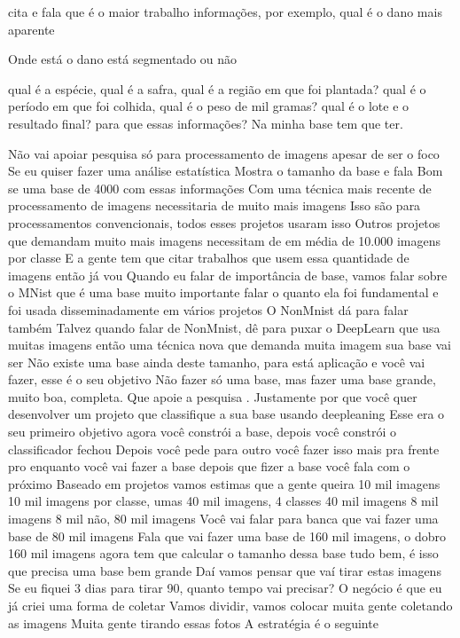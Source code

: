cita e fala que é o maior trabalho
informações, por exemplo, qual é o dano mais aparente

Onde está o dano
está segmentado ou não

qual é a espécie, qual é a safra, qual é a região em que foi plantada?
qual é o período em que foi colhida, qual é o peso de mil gramas?
qual é o lote e o resultado final?
para que essas informações? Na minha base tem que ter.

Não vai apoiar pesquisa só para processamento de imagens
apesar de ser o foco
Se eu quiser fazer uma análise estatística
Mostra o tamanho da base e fala
Bom se uma base de 4000 com essas informações
Com uma técnica mais recente de processamento de imagens
necessitaria de muito mais imagens
Isso são para processamentos convencionais, todos esses projetos usaram isso
Outros projetos que demandam muito mais imagens
necessitam de em média de 10.000 imagens por classe
E a gente tem que citar trabalhos que usem essa quantidade de imagens
então já vou
Quando eu falar de importância de base, vamos falar sobre o MNist
que é uma base muito importante
falar o quanto ela foi fundamental e foi usada disseminadamente em vários projetos
O NonMnist dá para falar também
Talvez quando falar de NonMnist, dê para puxar o DeepLearn
que usa muitas imagens
então uma técnica nova
que demanda muita imagem
sua base vai ser
Não existe uma base ainda
deste tamanho, para está aplicação
e você vai fazer, esse é o seu objetivo
Não fazer só uma base, mas fazer uma base grande, muito boa,
completa. Que apoie a pesquisa .
Justamente por que você quer desenvolver um projeto
que classifique a sua base usando deepleaning
Esse era o seu primeiro objetivo
agora você constrói a base, depois você constrói o classificador
fechou
Depois você pede para outro você fazer isso mais pra frente
pro enquanto você vai fazer a base
depois que fizer a base você fala com o próximo
Baseado em projetos
vamos estimas que a gente queira 10 mil imagens
10 mil imagens
por classe, umas 40 mil imagens, 4 classes 40 mil imagens
8 mil imagens
8 mil não, 80 mil imagens
Você vai falar para banca que vai fazer uma base de 80 mil imagens
Fala que vai fazer uma base de 160 mil imagens, o dobro
160 mil imagens
agora tem que calcular o tamanho dessa base
tudo bem, é isso que precisa uma base bem grande
Daí vamos pensar que vaí tirar estas imagens
Se eu fiquei 3 dias para tirar 90, quanto tempo vai precisar?
O negócio é que eu já criei uma forma de coletar
Vamos dividir, vamos colocar muita gente coletando as imagens
Muita gente tirando essas fotos
A estratégia é o seguinte

